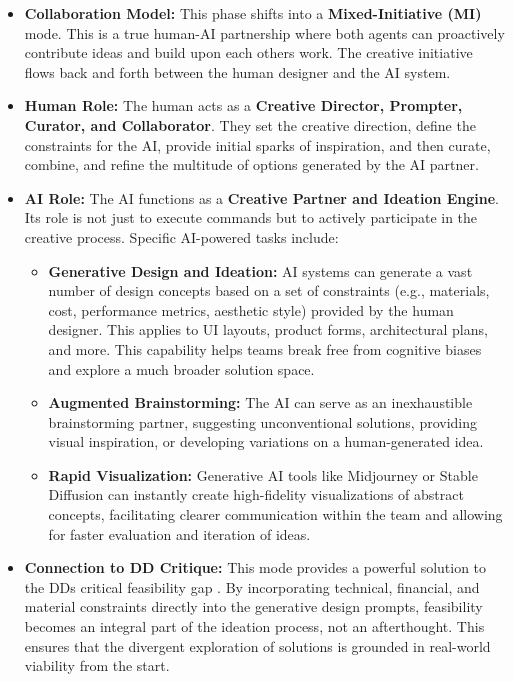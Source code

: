 \documentclass[
  12pt,
  a4paper,
  bibliography=totoc,
  numbers=noenddot
]{scrartcl}
\begin{document}
\begin{itemize}
\item
  \textbf{Collaboration Model:} This phase shifts into a
  \textbf{Mixed-Initiative (MI)} mode. This is a true human-AI
  partnership where both agents can proactively contribute ideas and
  build upon each other\textquotesingle s work. The creative initiative
  flows back and forth between the human designer and the AI system.
\item
  \textbf{Human Role:} The human acts as a \textbf{Creative Director,
  Prompter, Curator, and Collaborator}. They set the creative direction,
  define the constraints for the AI, provide initial sparks of
  inspiration, and then curate, combine, and refine the multitude of
  options generated by the AI partner.\cite{researchgate2025implications}
\item
  \textbf{AI Role:} The AI functions as a \textbf{Creative Partner and
  Ideation Engine}. Its role is not just to execute commands but to
  actively participate in the creative process. Specific AI-powered
  tasks include:

  \begin{itemize}
  \item
    \textbf{Generative Design and Ideation:} AI systems can generate a
    vast number of design concepts based on a set of constraints (e.g.,
    materials, cost, performance metrics, aesthetic style) provided by
    the human designer. This applies to UI layouts, product forms,
    architectural plans, and more.\cite{invozone2025collaborative} This capability
    helps teams break free from cognitive biases and explore a much
    broader solution space.\cite{ideou2025intersection}
  \item
    \textbf{Augmented Brainstorming:} The AI can serve as an
    inexhaustible brainstorming partner, suggesting unconventional
    solutions, providing visual inspiration, or developing variations on
    a human-generated idea.\cite{smythos2025exploring}
  \item
    \textbf{Rapid Visualization:} Generative AI tools like Midjourney or
    Stable Diffusion can instantly create high-fidelity visualizations
    of abstract concepts, facilitating clearer communication within the
    team and allowing for faster evaluation and iteration of
    ideas.\cite{researchgate2025thinking}
  \end{itemize}
\item
  \textbf{Connection to DD Critique:} This mode provides a powerful
  solution to the DD\textquotesingle s critical feasibility
  gap \cite{reddit2025double}. By incorporating technical, financial, and
  material constraints directly into the generative design prompts,
  feasibility becomes an integral part of the ideation process, not an
  afterthought. This ensures that the divergent exploration of solutions
  is grounded in real-world viability from the start.
\end{itemize}
\end{document}
